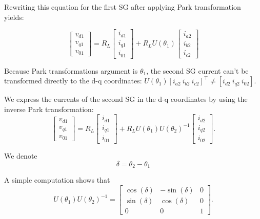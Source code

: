 \documentclass[letterpaper, 10 pt, conference]{ieeeconf}  %
\newcommand{\BE}{\begin{equation}}
\newcommand{\BEQ}[1]{\BE\label{#1}} %
\begin{document}
Rewriting this equation for the first SG after applying Park transformation yields:

$$
\left[\begin{array}{c}
v_{d1}\\
v_{q1}\\
v_{01}
\end{array}\right]=R_{L}\left[\begin{array}{c}
i_{d1}\\
i_{q1}\\
i_{01}
\end{array}\right]+R_{L}U(\theta_{1})\left[\begin{array}{c}
i_{a2}\\
i_{b2}\\
i_{c2}
\end{array}\right]
$$

Because Park transformations argument is  $\theta_1$,  the second SG current can't be transformed directly to the d-q coordinates:   $U(\theta_{1})\left[ i_{a2}\ i_{b2}\ i_{c2}\right]^\top \neq \left[ i_{d2}\ i_{q2}\ i_{02}\right]$. 

We express  the currents of the second SG in the d-q coordinates by using the inverse Park transformation: 
\BEQ{eq:TICSGVolAndCurr}
 \left[\begin{array}{c}
v_{d1}\\
v_{q1}\\
v_{01}
\end{array}\right]=R_{L}\left[\begin{array}{c}
i_{d1}\\
i_{q1}\\
i_{01}
\end{array}\right]+R_{L}U(\theta_{1})U(\theta_{2})^{-1}\left[\begin{array}{c}
i_{d2}\\
i_{q2}\\
i_{02}
\end{array}\right].
\end{equation}

We denote $$\delta=\theta_{2}-\theta_{1}$$

A simple computation shows that 
\BEQ{eq:ParkChangeAngle}
  U(\theta_{1})U(\theta_{2})^{-1}=\left[\begin{array}{ccc}
\cos(\delta) & -\sin(\delta) & 0\\
\sin(\delta) & \cos(\delta) & 0\\
0 & 0 & 1
\end{array}\right].
\end{equation}
\end{document}
